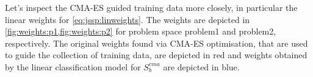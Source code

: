 Let's inspect the CMA-ES guided training data more closely, in particular the linear weights for \cref{eq:jssp:linweights}. The weights are depicted in \cref{fig:weights:p1,fig:weights:p2} for problem space problem{1} and problem{2}, respectively. The original weights found via CMA-ES optimisation, that are used to guide the collection of training data, are depicted in red and  weights obtained by the linear classification model for $S_b^{cma}$ are depicted in blue.


\begin{figure}\centering

\end{figure}
